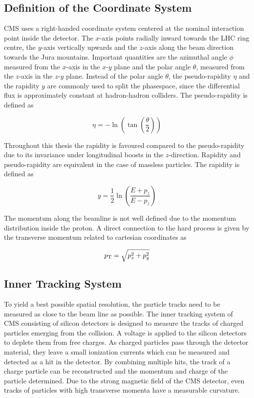 
\subsection{Definition of the Coordinate System}

CMS uses a right-handed coordinate system centered at the nominal interaction point inside the
detector. The $x$-axis points radially inward towards the LHC ring centre, the
$y$-axis vertically upwards and the $z$-axis along the beam direction towards
the Jura mountains. Important quantities are the azimuthal angle $\phi$
measured from the $x$-axis in the $x$-$y$ plane and the polar angle $\theta$,
measured from the $z$-axis in the $z$-$y$ plane. Instead of the polar angle
$\theta$, the pseudo-rapidity $\eta$ and the rapidity $y$ are commonly used to
split the phasespace, since the differential flux is approximately constant at
hadron-hadron colliders. The pseudo-rapidity is defined as

\begin{equation*}
    \eta = - \ln \left( \tan \left( \frac{\theta}{2} \right) \right)
\end{equation*}

Throughout this thesis the rapidity is favoured compared to the pseudo-rapidity
due to its invariance under longitudinal boosts in the $z$-direction. Rapidity
and pseudo-rapidity are equivalent in the case of massless particles. The
rapidity is defined as

\begin{equation*}
    y = \frac{1}{2} \ln \left( \frac{E + p_z}{E - p_z} \right) 
\end{equation*}

The momentum along the beamline is not well defined due to the momentum
distribution inside the proton. A direct connection to the hard process is given
by the transverse momentum \pt related to cartesian coordinates as

\begin{equation*}
    p_{\mathrm{T}} = \sqrt{p_x^2 + p_y^2}
\end{equation*}

\subsection{Inner Tracking System}

To yield a best possible spatial resolution, the particle tracks need to be
measured as close to the beam line as possible. The inner tracking system of CMS
consisting of silicon detectors is designed to measure the tracks of charged
particles emerging from the collision. A voltage is applied to the silicon
detectors to deplete them from free charges. As charged particles pass through
the detector material, they leave a small ionization currents which can be
measured and detected as a hit in the detector. By combining multiple hits, the
track of a charge particle can be reconstructed and the momentum and charge of
the particle determined. Due to the strong magnetic field of the CMS detector,
even tracks of particles with high transverse momenta have a measurable
curvature.
 
